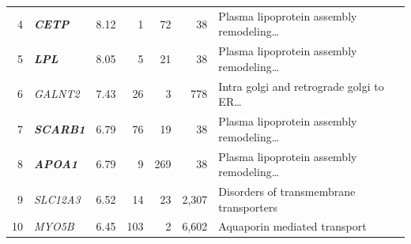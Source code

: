 \begin{table}[!htbp]
\begin{tabular*}{\linewidth}{@{\extracolsep{\fill}}rlrrrrl}
4 & \textbf{\textit{CETP}} & 8.12 & 1 & 72 & 38 & Plasma lipoprotein assembly remodeling\ldots \\
5 & \textbf{\textit{LPL}} & 8.05 & 5 & 21 & 38 & Plasma lipoprotein assembly remodeling\ldots \\
6 & \textit{GALNT2} & 7.43 & 26 & 3 & 778 & Intra golgi and retrograde golgi to ER\ldots \\
7 & \textbf{\textit{SCARB1}} & 6.79 & 76 & 19 & 38 & Plasma lipoprotein assembly remodeling\ldots \\
8 & \textbf{\textit{APOA1}} & 6.79 & 9 & 269 & 38 & Plasma lipoprotein assembly remodeling\ldots \\
9 & \textit{SLC12A3} & 6.52 & 14 & 23 & 2{,}307 & Disorders of transmembrane transporters \\
10 & \textit{MYO5B} & 6.45 & 103 & 2 & 6{,}602 & Aquaporin mediated transport \\
\hline
\end{tabular*}
\end{table}
